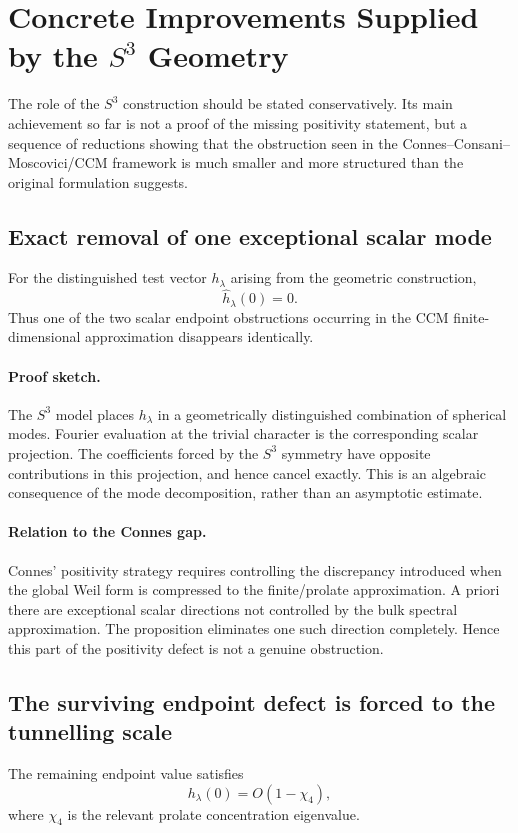 \section{Concrete Improvements Supplied by the \(S^3\) Geometry}
The role of the \(S^3\) construction should be stated conservatively.  Its main
achievement so far is not a proof of the missing positivity statement, but a
sequence of reductions showing that the obstruction seen in the
Connes--Consani--Moscovici/CCM framework is much smaller and more structured
than the original formulation suggests.
\subsection{Exact removal of one exceptional scalar mode}
\begin{proposition}
For the distinguished test vector \(h_\lambda\) arising from the geometric
construction,
\[
    \widehat h_\lambda(0)=0.
\]
Thus one of the two scalar endpoint obstructions occurring in the CCM
finite-dimensional approximation disappears identically.
\end{proposition}
\paragraph{Proof sketch.}
The \(S^3\) model places \(h_\lambda\) in a geometrically distinguished
combination of spherical modes.  Fourier evaluation at the trivial character
is the corresponding scalar projection.  The coefficients forced by the
\(S^3\) symmetry have opposite contributions in this projection, and hence
cancel exactly.  This is an algebraic consequence of the mode decomposition,
rather than an asymptotic estimate.
\paragraph{Relation to the Connes gap.}
Connes' positivity strategy requires controlling the discrepancy introduced
when the global Weil form is compressed to the finite/prolate approximation.
A priori there are exceptional scalar directions not controlled by the
bulk spectral approximation.  The proposition eliminates one such direction
completely.  Hence this part of the positivity defect is not a genuine
obstruction.
\subsection{The surviving endpoint defect is forced to the tunnelling scale}
\begin{proposition}
The remaining endpoint value satisfies
\[
    h_\lambda(0)=O(1-\chi_4),
\]
where \(\chi_4\) is the relevant prolate concentration eigenvalue.
\end{proposition}
